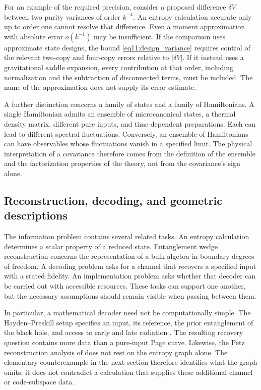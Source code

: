 \documentclass[11pt,letterpaper]{article}
\theoremstyle{plain}
\theoremstyle{definition}
\theoremstyle{remark}
\begin{document}
For an example of the required precision, consider a proposed difference
$\delta V$ between two purity variances of order $k^{-4}$. An entropy
calculation accurate only up to order one cannot resolve that difference.
Even a moment approximation with absolute error $o(k^{-1})$ may be
insufficient. If the comparison uses approximate state designs, the
bound \eqref{eq11:design_variance} requires control of the relevant
two-copy and four-copy errors relative to $|\delta V|$. If it instead
uses a gravitational saddle expansion, every contribution at that order,
including normalization and the subtraction of disconnected terms,
must be included. The name of the approximation does not supply its
error estimate.

A further distinction concerns a family of states and a family of
Hamiltonians. A single Hamiltonian admits an ensemble of microcanonical
states, a thermal density matrix, different pure inputs, and time-dependent
preparations. Each can lead to different spectral fluctuations. Conversely,
an ensemble of Hamiltonians can have observables whose fluctuations
vanish in a specified limit. The physical interpretation of a covariance
therefore comes from the definition of the ensemble and the factorization
properties of the theory, not from the covariance's sign alone.

\subsection{Reconstruction, decoding, and geometric descriptions}
\label{subsec13:synthesis}

The information problem contains several related tasks. An entropy
calculation determines a scalar property of a reduced state. Entanglement
wedge reconstruction concerns the representation of a bulk algebra in
boundary degrees of freedom. A decoding problem asks for a channel that
recovers a specified input with a stated fidelity. An implementation
problem asks whether that decoder can be carried out with accessible
resources. These tasks can support one another, but the necessary
assumptions should remain visible when passing between them.

In particular, a mathematical decoder need not be computationally simple.
The Hayden--Preskill setup specifies an input, its reference, the prior
entanglement of the black hole, and access to early and late radiation
\citep{haydenpreskill2007}. The resulting recovery question contains
more data than a pure-input Page curve. Likewise, the Petz reconstruction
analysis of \citet{pssyetal2022} does not rest on the entropy graph alone.
The elementary counterexample in the next section therefore identifies
what the graph omits; it does not contradict a calculation that supplies
these additional channel or code-subspace data.
\end{document}
